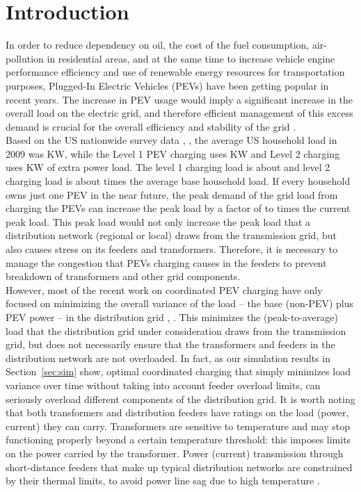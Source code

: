 \documentclass[12pt,draftcls,onecolumn]{IEEEtran}
\begin{document}
\section{Introduction}
\indent In order to reduce dependency on oil, the cost of the fuel consumption, air-pollution in residential areas, and at the same time to increase vehicle engine performance efficiency and use of renewable energy resources for transportation purposes, Plugged-In Electric Vehicles (PEVs) have been getting popular in recent years. The increase in PEV usage would imply a significant increase in the overall load on the electric grid, and therefore efficient management of this excess demand is crucial for the overall efficiency and stability of the grid \cite{HT09}.\\
\indent Based on the US nationwide survey data \cite{US09}, \cite{PR04}, the average US household load in 2009 was  KW, while the Level 1 PEV charging uses  KW and Level 2 charging uses KW of extra power load. The level 1 charging load is about  and level 2 charging load is about  times the average base household load. If every household owns just one PEV in the near future, the peak demand of the grid load from charging the PEVs can increase the peak load by a factor of  to  times the current peak load. This peak load would not only increase the peak load that a distribution network (regional or local) draws from the transmission grid, but also causes stress on its feeders and transformers. Therefore, it is necessary to manage the congestion that PEVs charging causes in the feeders to prevent breakdown of transformers and other grid components.\\
\indent However, most of the recent work on coordinated PEV charging have only focused on minimizing the overall variance of the load -- the base (non-PEV) plus PEV power -- in the distribution grid \cite{MCH10}, \cite{GTL13}. This minimizes the (peak-to-average) load that the distribution grid under consideration draws from the transmission grid, but does not necessarily ensure that the transformers and feeders in the distribution network are not overloaded. In fact, as our simulation results in Section~\ref{sec:sim} show, optimal coordinated charging that simply minimizes load variance over time without taking into account feeder overload limits, can seriously overload different components of the distribution grid. It is worth noting that both transformers and distribution feeders have ratings on the load (power, current) they can carry. Transformers are sensitive to temperature and may stop functioning properly beyond a certain temperature threshold: this imposes limits on the power carried by the transformer. Power (current) transmission through short-distance feeders that make up typical distribution networks are constrained by their thermal limits, to avoid power line sag due to high temperature \cite{GE79}.\\
\end{document}
